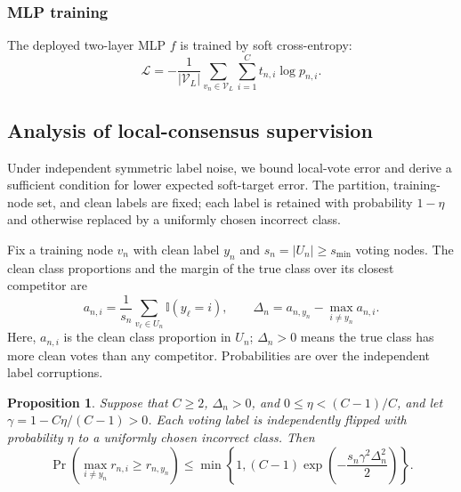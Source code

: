 \documentclass[times,review,10pt]{elsarticle}
\theoremstyle{definition}
\theoremstyle{plain}
\newtheorem{proposition}{Proposition}
\begin{document}


\subsubsection{MLP training}\label{sec:3.3.3}

The deployed two-layer MLP \(f\) is trained by soft cross-entropy:
\begin{equation}\label{eq:13}
\mathcal L=-\frac{1}{|\mathcal V_L|}\sum_{v_n\in\mathcal V_L}\sum_{i=1}^C t_{n,i}\log p_{n,i}.
\end{equation}

\subsection{Analysis of local-consensus supervision}\label{sec:3.4}

Under independent symmetric label noise, we bound local-vote error and derive a sufficient condition for lower expected soft-target error. The partition, training-node set, and clean labels are fixed; each label is retained with probability \(1-\eta\) and otherwise replaced by a uniformly chosen incorrect class.

Fix a training node \(v_n\) with clean label \(y_n\) and \(s_n=|U_n|\geq s_{\min}\) voting nodes. The clean class proportions and the margin of the true class over its closest competitor are
\begin{equation}\label{eq:14}
a_{n,i}=\frac{1}{s_n}\sum_{v_\ell\in U_n}\mathbb I(y_\ell=i),
\qquad
\Delta_n=a_{n,y_n}-\max_{i\ne y_n}a_{n,i}.
\end{equation}
Here, \(a_{n,i}\) is the clean class proportion in \(U_n\); \(\Delta_n>0\) means the true class has more clean votes than any competitor. Probabilities are over the independent label corruptions.

\begin{proposition}\label{prop:local_vote}
Suppose that \(C\geq2\), \(\Delta_n>0\), and \(0\leq\eta<(C-1)/C\), and let \(\gamma=1-C\eta/(C-1)>0\). Each voting label is independently flipped with probability \(\eta\) to a uniformly chosen incorrect class. Then
\begin{equation}\label{eq:15}
\Pr\!\left(\max_{i\ne y_n}r_{n,i}\geq r_{n,y_n}\right)
\leq\min\!\left\{1,(C-1)\exp\!\left(-\frac{s_n\gamma^2\Delta_n^2}{2}\right)\right\}.
\end{equation}
\end{proposition}
\end{document}
